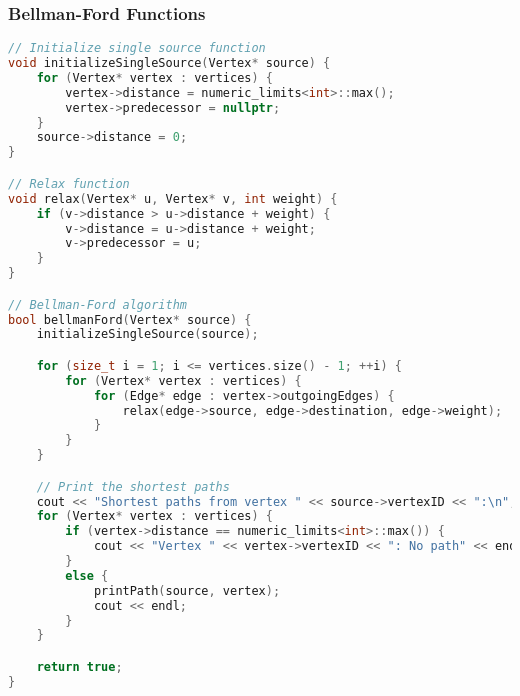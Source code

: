 \documentclass[letterpaper, 10pt,DIV=13]{scrartcl}
\numberwithin{equation}{section} %
\numberwithin{figure}{section} %
\numberwithin{table}{section} %
\begin{document}
\subsubsection{Bellman-Ford Functions}
\begin{linenumbers}
\begin{lstlisting}[language=C++, caption={Bellman-Ford Functions}, label={code:example}]
// Initialize single source function
void initializeSingleSource(Vertex* source) {
    for (Vertex* vertex : vertices) {
        vertex->distance = numeric_limits<int>::max();
        vertex->predecessor = nullptr;
    }
    source->distance = 0;
}

// Relax function
void relax(Vertex* u, Vertex* v, int weight) {
    if (v->distance > u->distance + weight) {
        v->distance = u->distance + weight;
        v->predecessor = u;
    }
}

// Bellman-Ford algorithm
bool bellmanFord(Vertex* source) {
    initializeSingleSource(source);

    for (size_t i = 1; i <= vertices.size() - 1; ++i) {
        for (Vertex* vertex : vertices) {
            for (Edge* edge : vertex->outgoingEdges) {
                relax(edge->source, edge->destination, edge->weight);
            }
        }
    }

    // Print the shortest paths
    cout << "Shortest paths from vertex " << source->vertexID << ":\n";
    for (Vertex* vertex : vertices) {
        if (vertex->distance == numeric_limits<int>::max()) {
            cout << "Vertex " << vertex->vertexID << ": No path" << endl;
        }
        else {
            printPath(source, vertex);
            cout << endl;
        }
    }

    return true;
}
\end{lstlisting}
\end{linenumbers}
\nolinenumbers
\end{document}
